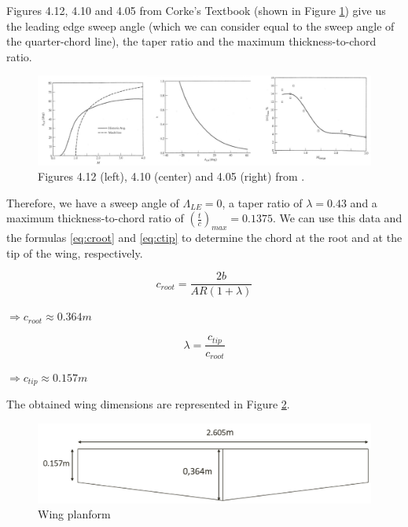 \documentclass[english,fira]{ist-report}
\begin{document}
 Figures 4.12, 4.10 and 4.05 from Corke's Textbook (shown in Figure \ref{fig:corke}) give us the leading edge sweep angle (which we can consider equal to the sweep angle of the quarter-chord line), the taper ratio and the maximum thickness-to-chord ratio. 
 
 \begin{figure}[ht]
     \centering
     \includegraphics[width=\textwidth]{graphics/WingDesign/corke.png}
     \caption{Figures 4.12 (left), 4.10 (center) and 4.05 (right) from  \cite{corke}.}%
     \label{fig:corke}
 \end{figure}
 
 Therefore, we have a sweep angle of $\Lambda_{LE} =0$, a taper ratio of $\lambda=0.43$ and a maximum thickness-to-chord ratio of $(\frac{t}{c})_{max}=0.1375$. We can use this data and the formulas \ref{eq:croot} and \ref{eq:ctip} to determine the chord at the root and at the tip of the wing, respectively. 

\begin{equation}\label{eq:croot}
    c_{root}=\frac{2b}{AR(1+\lambda)}
\end{equation}
\begin{center}
    $\Rightarrow c_{root} \approx 0.364m  $
\end{center} \newpage
\begin{equation}\label{eq:ctip}
    \lambda = \frac{c_{tip}}{c_{root}}
\end{equation}
\begin{center}
    $\Rightarrow c_{tip} \approx 0.157m  $
\end{center}

The obtained wing dimensions are represented in Figure \ref{fig:planform}.

\begin{figure}[ht]
    \centering
    \includegraphics[width=\textwidth]{graphics/WingDesign/planform.png}
    \caption{Wing planform}
    \label{fig:planform}
\end{figure}
\end{document}
